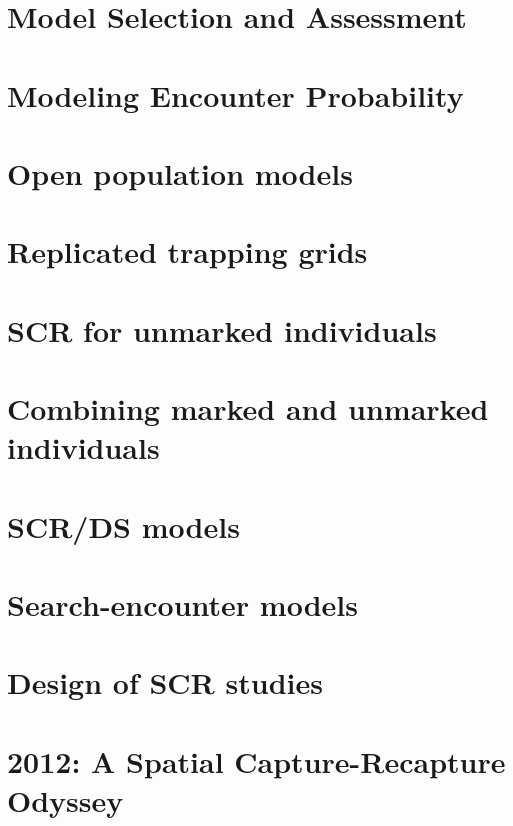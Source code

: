 \documentclass{book}
\begin{document}
\chapter{Model Selection and Assessment}
\label{chapt.gof}

\chapter{Modeling Encounter Probability}
\label{chapt.covariates}






\chapter{Open population models}
\label{chapt.open}

\chapter{Replicated trapping grids}
\label{hscr}

\chapter{SCR for unmarked individuals}
\label{chapt.unmarked}

\chapter{Combining marked and unmarked individuals}
\label{chapt.hscr}

\chapter{SCR/DS models }
\label{chapt.scrds}

\chapter{Search-encounter models}
\label{chapt.searchencounter}

\chapter{Design of SCR studies}
\label{chapt.design}

\chapter{2012: A Spatial Capture-Recapture Odyssey}
\label{chapt.discussion}









\end{document}
